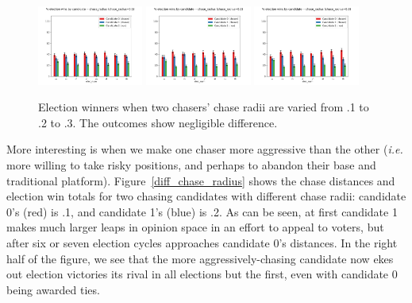 \begin{figure}[ht]
\centering
\includegraphics[width=0.31\textwidth]{assets/chase_radius_.1_winners.png}
\includegraphics[width=0.31\textwidth]{assets/chase_radius_.2_winners.png}
\includegraphics[width=0.31\textwidth]{assets/chase_radius_.3_winners.png}
\caption{Election winners when two chasers' chase radii are varied from .1 to
.2 to .3. The outcomes show negligible difference.}
\label{chase_radius}
\end{figure}

More interesting is when we make one chaser more aggressive than the other
(\textit{i.e.} more willing to take risky positions, and perhaps to abandon
their base and traditional platform). Figure~\ref{diff_chase_radius} shows the
chase distances and election win totals for two chasing candidates with
different chase radii: candidate 0's (red) is .1, and candidate 1's (blue) is
.2. As can be seen, at first candidate 1 makes much larger leaps in opinion
space in an effort to appeal to voters, but after six or seven election cycles
approaches candidate 0's distances. In the right half of the figure, we see
that the more aggressively-chasing candidate now ekes out election victories
its rival in all elections but the first, even with candidate 0 being awarded
ties.

